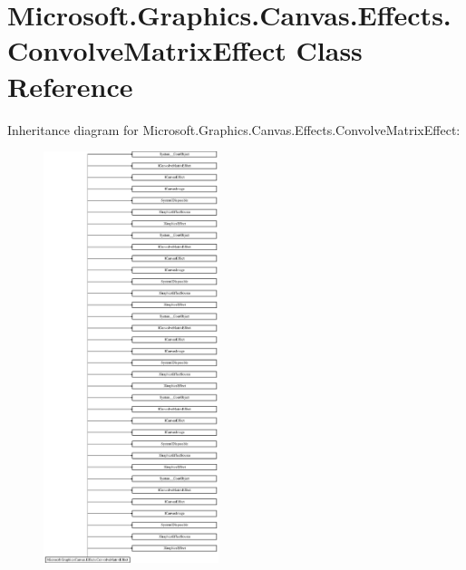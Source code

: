 \hypertarget{class_microsoft_1_1_graphics_1_1_canvas_1_1_effects_1_1_convolve_matrix_effect}{}\section{Microsoft.\+Graphics.\+Canvas.\+Effects.\+Convolve\+Matrix\+Effect Class Reference}
\label{class_microsoft_1_1_graphics_1_1_canvas_1_1_effects_1_1_convolve_matrix_effect}
Inheritance diagram for Microsoft.\+Graphics.\+Canvas.\+Effects.\+Convolve\+Matrix\+Effect\+:\begin{figure}[H]
\begin{center}
\leavevmode
\includegraphics[height=12.000000cm]{class_microsoft_1_1_graphics_1_1_canvas_1_1_effects_1_1_convolve_matrix_effect}
\end{center}
\end{figure}
